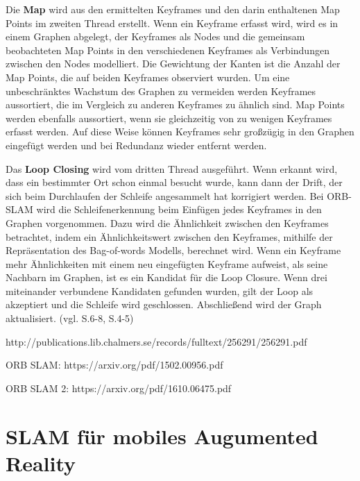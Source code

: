 Die \textbf{Map} wird aus den ermittelten Keyframes und den darin enthaltenen Map Points im zweiten Thread erstellt. Wenn ein Keyframe erfasst wird, wird es in einem Graphen abgelegt, der Keyframes als Nodes und die gemeinsam beobachteten Map Points in den verschiedenen Keyframes als Verbindungen zwischen den Nodes modelliert. Die Gewichtung der Kanten ist die Anzahl der Map Points, die auf beiden Keyframes observiert wurden. Um eine unbeschränktes Wachstum des Graphen zu vermeiden werden Keyframes aussortiert, die im Vergleich zu anderen Keyframes zu ähnlich sind. Map Points werden ebenfalls aussortiert, wenn sie gleichzeitig von zu wenigen Keyframes erfasst werden. Auf diese Weise können Keyframes sehr großzügig in den Graphen eingefügt werden und bei Redundanz wieder entfernt werden.

Das \textbf{Loop Closing} wird vom dritten Thread ausgeführt. Wenn erkannt wird, dass ein bestimmter Ort schon einmal besucht wurde, kann dann der Drift, der sich beim Durchlaufen der Schleife angesammelt hat korrigiert werden. Bei ORB-SLAM wird die Schleifenerkennung beim Einfügen jedes Keyframes in den Graphen vorgenommen. Dazu wird die Ähnlichkeit zwischen den Keyframes betrachtet, indem ein Ähnlichkeitswert zwischen den Keyframes, mithilfe der Repräsentation des \glqq Bag-of-words\grqq{} Modells, berechnet wird. Wenn ein Keyframe mehr Ähnlichkeiten mit einem neu eingefügten Keyframe aufweist, als seine Nachbarn im Graphen, ist es ein Kandidat für die Loop Closure. Wenn drei miteinander verbundene Kandidaten gefunden wurden, gilt der Loop als akzeptiert und die Schleife wird geschlossen. Abschließend wird der Graph aktualisiert. (vgl. \cite{orbslam_og} S.6-8, \cite{orb_slam} S.4-5)

http://publications.lib.chalmers.se/records/fulltext/256291/256291.pdf

ORB SLAM:
https://arxiv.org/pdf/1502.00956.pdf

ORB SLAM 2:
https://arxiv.org/pdf/1610.06475.pdf




\section{SLAM für mobiles Augumented Reality}

